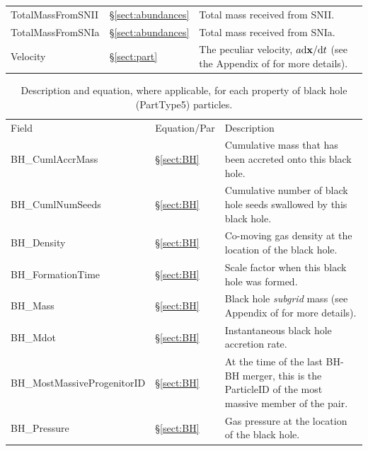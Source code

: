 \documentclass[10pt, a4paper]{article}
\newcommand{\velocity}{The peculiar velocity, $a{\rm d}{\bf x}/{\rm d}t$ (see
the Appendix of \cite{mcalpine2016} for more details).}
\begin{document}
\begin{table}
\begin{center}
\begin{tabular}{>{\ttfamily}p{4cm}p{1.5cm}p{11cm}}
TotalMassFromSNII &
\S\ref{sect:abundances} &
Total mass received from SNII. \\

TotalMassFromSNIa &
\S\ref{sect:abundances} &
Total mass received from SNIa. \\

Velocity &
\S\ref{sect:part}& \velocity \\

\hline
\end{tabular}
\end{center}
\end{table}

\begin{table}
\label{table:bh}
\caption{Description and equation, where applicable, for each property of black hole
(PartType5) particles.}
\begin{center}
\footnotesize
\renewcommand{\arraystretch}{1.5}
\begin{tabular}{>{\ttfamily}p{4cm}p{1.5cm}p{11cm}}
\multicolumn{3}{l}{\large \bf PartType5: Black Holes} \\
\hline
Field & Equation/Par & Description \\ \hline\hline

BH\_CumlAccrMass &
\S\ref{sect:BH} &
Cumulative mass that has been accreted onto this black hole.  \\

BH\_CumlNumSeeds &
\S\ref{sect:BH} &
Cumulative number of black hole seeds swallowed by this black hole. \\

BH\_Density &
\S\ref{sect:BH} &
Co-moving gas density at the location of the black hole. \\

BH\_FormationTime &
\S\ref{sect:BH} &
Scale factor when this black hole was formed. \\

BH\_Mass &
\S\ref{sect:BH} &
Black hole \textit{subgrid} mass (see Appendix of \cite{mcalpine2016} for more details). \\

BH\_Mdot &
\S\ref{sect:BH} &
Instantaneous black hole accretion rate. \\

BH\_MostMassiveProgenitorID &
\S\ref{sect:BH} &
At the time of the last BH-BH merger, this is the ParticleID of the most massive member of the pair. \\

BH\_Pressure &
\S\ref{sect:BH} &
Gas pressure at the location of the black hole. \\


\end{tabular}
\end{center}
\end{table}
\end{document}
